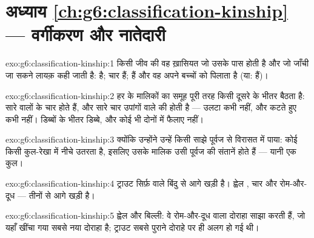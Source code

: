 \section*{अध्याय \ref{ch:g6:classification-kinship} --- वर्गीकरण और नातेदारी}

\begin{solution}{exo:g6:classification-kinship:1}
किसी जीव की वह ख़ासियत जो उसके पास होती है और जो जाँची जा सकने लायक़
कही जाती है:  है; चार  हैं;  हैं और वह अपने बच्चों को 
पिलाता है (या:  हैं)।
\end{solution}

\begin{solution}{exo:g6:classification-kinship:2}
हर  के मालिकों का समूह पूरी तरह किसी दूसरे के भीतर बैठता है:
सारे  वालों के चार  होते हैं, और सारे चार उपांगों वाले 
की  होती है --- उलटा कभी नहीं, और कटते हुए कभी नहीं। डिब्बों के
भीतर डिब्बे, और कोई भी दोनों में  फैलाए नहीं।
\end{solution}

\begin{solution}{exo:g6:classification-kinship:3}
क्योंकि उन्होंने उन्हें किसी साझे पूर्वज से विरासत में पाया: कोई
 किसी कुल-रेखा में नीचे उतरता है, इसलिए उसके मालिक उसी पूर्वज
की संतानें होते हैं --- यानी एक कुल।
\end{solution}

\begin{solution}{exo:g6:classification-kinship:4}
ट्राउट सिर्फ़  वाले बिंदु से आगे खड़ी है। ह्वेल , चार  और
रोम-और-दूध --- तीनों से आगे खड़ी है।
\end{solution}

\begin{solution}{exo:g6:classification-kinship:5}
ह्वेल और बिल्ली: वे रोम-और-दूध वाला दोराहा साझा करती हैं, जो यहाँ
खींचा गया सबसे नया दोराहा है; ट्राउट सबसे पुराने दोराहे पर ही अलग हो
गई थी।
\end{solution}

